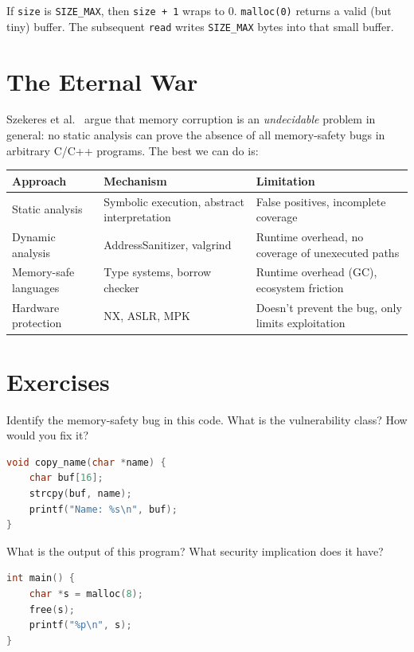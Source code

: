 If \texttt{size} is \texttt{SIZE\_MAX}, then \texttt{size + 1} wraps to 0. \texttt{malloc(0)} returns a valid (but tiny) buffer. The subsequent \texttt{read} writes \texttt{SIZE\_MAX} bytes into that small buffer.

\section{The Eternal War}

Szekeres et al.~\cite{szekeres2013eternal} argue that memory corruption is an \emph{undecidable} problem in general: no static analysis can prove the absence of all memory-safety bugs in arbitrary C/C++ programs. The best we can do is:

\begin{longtable}{p{4cm}p{4.5cm}p{4.5cm}}
	\toprule
	\textbf{Approach}     & \textbf{Mechanism}                          & \textbf{Limitation}                               \\
	\midrule
	Static analysis       & Symbolic execution, abstract interpretation & False positives, incomplete coverage              \\
	Dynamic analysis      & AddressSanitizer, valgrind                  & Runtime overhead, no coverage of unexecuted paths \\
	Memory-safe languages & Type systems, borrow checker                & Runtime overhead (GC), ecosystem friction         \\
	Hardware protection   & NX, ASLR, MPK                               & Doesn't prevent the bug, only limits exploitation \\
	\bottomrule
\end{longtable}

\section{Exercises}

\begin{exercise}
	Identify the memory-safety bug in this code. What is the vulnerability class? How would you fix it?
	\begin{lstlisting}[language=C]
void copy_name(char *name) {
    char buf[16];
    strcpy(buf, name);
    printf("Name: %s\n", buf);
}
	\end{lstlisting}
\end{exercise}

\begin{exercise}
	What is the output of this program? What security implication does it have?
	\begin{lstlisting}[language=C]
int main() {
    char *s = malloc(8);
    free(s);
    printf("%p\n", s);
}
	\end{lstlisting}
\end{exercise}

